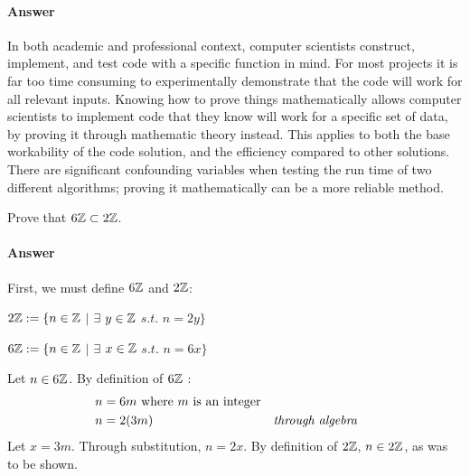 \documentclass{article}
\begin{document}
\paragraph{Answer}

In both academic and professional context, computer scientists construct, implement, and test code with a specific function in mind. For most projects it is far too time consuming to experimentally demonstrate that the code will work for all relevant inputs. Knowing how to prove things mathematically allows computer scientists to implement code that they know will work for a specific set of data, by proving it through mathematic theory instead. This applies to both the base workability of the code solution, and the efficiency compared to other solutions. There are significant confounding variables when testing the run time of two different algorithms; proving it mathematically can be a more reliable method.



Prove that $6{\mathbb Z} \subset 2{\mathbb Z}$.

\paragraph{Answer} First, we must define $6{\mathbb Z}$ and $2{\mathbb Z}$:

$2{\mathbb Z} := \{ n \in {\mathbb Z} $ $|$ $ \exists $ $y \in {\mathbb Z} $ $s.t.$ $n=2y \}$

$6{\mathbb Z} := \{ n \in {\mathbb Z} $ $|$ $ \exists $ $x \in {\mathbb Z} $ $s.t.$ $n=6x \}$

Let $n \in 6{\mathbb Z}$.  By definition of $6{\mathbb Z}$ :
\begin{align}
    \nonumber n & = 6m \text{ where } m \text{ is an integer} \\
    \nonumber n & = 2(3m) && \text{\emph{through algebra }}
\end{align}
Let $x = 3m$. Through substitution, $n=2x$. By definition of $2{\mathbb Z}$, $n\in 2{\mathbb Z}$, as was to be shown.


\end{document}
